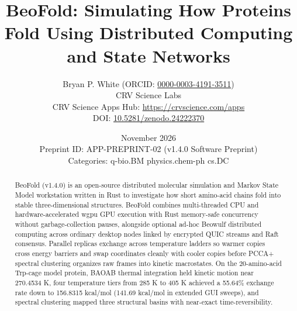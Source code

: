 \documentclass[10pt,letterpaper]{article}
\title{\textbf{BeoFold: Simulating How Proteins Fold Using Distributed Computing and State Networks}}
\author{Bryan P. White (ORCID: \href{https://orcid.org/0000-0003-4191-3511}{0000-0003-4191-3511}) \\ CRV Science Labs \\ \small CRV Science Apps Hub: \url{https://crvscience.com/apps} \\ \small DOI: \href{https://doi.org/10.5281/zenodo.24222370}{10.5281/zenodo.24222370}}
\date{November 2026 \\ \small Preprint ID: APP-PREPRINT-02 (v1.4.0 Software Preprint) \\ \small Categories: q-bio.BM \textbullet{} physics.chem-ph \textbullet{} cs.DC}
\begin{document}
\maketitle

\begin{abstract}
BeoFold (v1.4.0) is an open-source distributed molecular simulation and Markov State Model workstation written in Rust to investigate how short amino-acid chains fold into stable three-dimensional structures. BeoFold combines multi-threaded CPU and hardware-accelerated wgpu GPU execution with Rust memory-safe concurrency without garbage-collection pauses, alongside optional ad-hoc Beowulf distributed computing across ordinary desktop nodes linked by encrypted QUIC streams and Raft consensus. Parallel replicas exchange across temperature ladders so warmer copies cross energy barriers and swap coordinates cleanly with cooler copies before PCCA+ spectral clustering organizes raw frames into kinetic macrostates. On the 20-amino-acid Trp-cage model protein, BAOAB thermal integration held kinetic motion near 270.4534 K, four temperature tiers from 285 K to 405 K achieved a 55.64\% exchange rate down to 156.8315 kcal/mol (141.69 kcal/mol in extended GUI sweeps), and spectral clustering mapped three structural basins with near-exact time-reversibility.
\end{abstract}
\end{document}
